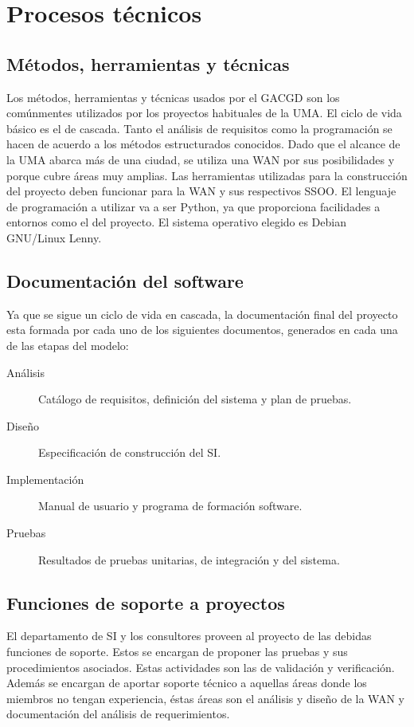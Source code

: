 \documentclass[11pt,a4paper,spanish,twoside]{report}
\begin{document}
\chapter{Procesos técnicos}
\section{Métodos, herramientas y técnicas}
Los métodos, herramientas y técnicas usados por el GACGD son los comúnmentes 
utilizados por los proyectos habituales de la UMA. El ciclo de vida básico es 
el de cascada. Tanto el análisis de requisitos como la programación se hacen 
de acuerdo a los métodos estructurados conocidos. Dado que el alcance de la 
UMA abarca más de una ciudad, se utiliza una WAN por sus posibilidades y 
porque cubre áreas muy amplias. Las herramientas utilizadas para la 
construcción del proyecto deben funcionar para la WAN y sus respectivos SSOO. 
El lenguaje de programación a utilizar va a ser Python, ya que proporciona 
facilidades a entornos como el del proyecto. El sistema operativo elegido es 
Debian GNU/Linux Lenny.

\section{Documentación del software}
Ya que se sigue un ciclo de vida en cascada, la documentación final del 
proyecto esta formada por cada uno de los siguientes documentos, generados en 
cada una de las etapas del modelo:

\begin{description}
\item[Análisis] Catálogo de requisitos, definición del sistema y plan de
  pruebas.  
\item[Diseño] Especificación de construcción del SI.
\item[Implementación] Manual de usuario y programa de formación software. 
\item[Pruebas] Resultados de pruebas unitarias, de integración y del sistema.
\end{description}

\section{Funciones de soporte a proyectos}
El departamento de SI y los consultores proveen al proyecto de las debidas 
funciones de soporte. Estos se encargan de proponer las pruebas y sus 
procedimientos asociados. Estas actividades son las de validación y 
verificación. Además se encargan de aportar soporte técnico a aquellas áreas 
donde los miembros no tengan experiencia, éstas áreas son el análisis y diseño 
de la WAN y documentación del análisis de requerimientos.
\end{document}
